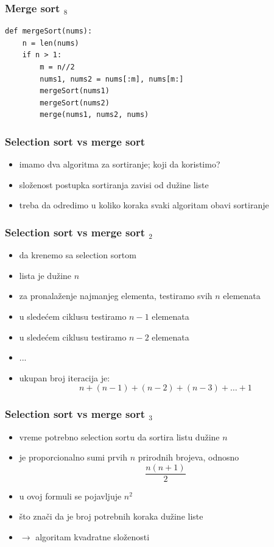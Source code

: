 \documentclass[utf8,compress,aspectratio=169]{beamer}
\begin{document}
\begin{frame}[fragile]
  \frametitle{Merge sort $_8$}
\begin{verbatim}
def mergeSort(nums):
    n = len(nums)
    if n > 1:
        m = n//2
        nums1, nums2 = nums[:m], nums[m:]
        mergeSort(nums1)
        mergeSort(nums2)
        merge(nums1, nums2, nums)
\end{verbatim}
\end{frame}

\begin{frame}[fragile]
  \frametitle{Selection sort vs merge sort}
  \begin{itemize}
    \item imamo dva algoritma za sortiranje; koji da koristimo?
    \item složenost postupka sortiranja zavisi od dužine liste
    \item treba da odredimo u koliko koraka svaki algoritam obavi sortiranje
  \end{itemize}
\end{frame}

\begin{frame}[fragile]
  \frametitle{Selection sort vs merge sort $_2$}
  \begin{itemize}
    \item da krenemo sa selection sortom
    \item lista je dužine $n$
    \item za pronalaženje najmanjeg elementa, testiramo svih $n$ elemenata
    \item u sledećem ciklusu testiramo $n-1$ elemenata
    \item u sledećem ciklusu testiramo $n-2$ elemenata
    \item ...
    \item ukupan broj iteracija je: \\
      $$ n + (n-1) + (n-2) + (n-3) + \ldots + 1 $$
  \end{itemize}
\end{frame}

\begin{frame}[fragile]
  \frametitle{Selection sort vs merge sort $_3$}
  \begin{itemize}
    \item vreme potrebno selection sortu da sortira listu dužine $n$
    \item je proporcionalno sumi prvih $n$ prirodnih brojeva, odnosno \\
      $$ \frac{n(n+1)}{2} $$
    \item u ovoj formuli se pojavljuje $n^2$
    \item što znači da je broj potrebnih koraka  dužine liste
    \item $\rightarrow$ algoritam kvadratne složenosti
  \end{itemize}
\end{frame}
\end{document}

